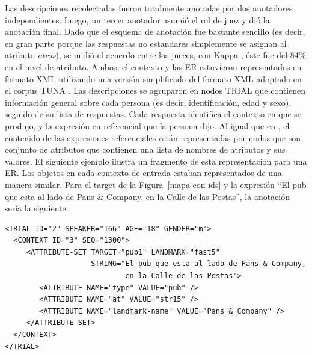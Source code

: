 
Las descripciones recolectadas fueron totalmente anotadas por dos anotadores independientes. Luego, un tercer anotador asumi\'o el rol de juez y di\'o la anotaci\'on final. Dado que el esquema de anotaci\'on fue bastante sencillo (es decir, en gran parte porque las respuestas no estandares simplemente se asignan al atributo {\em otros}), se midi\'o el acuerdo entre los jueces, con Kappa \cite{kappa}, \'este fue del 84\% en el nivel de atributo.
Ambos, el contexto y las ER estuvieron representados en formato XML utilizando una versi\'on simplificada del formato XML adoptado en el corpus TUNA \cite{tuna-corpus}. Las descripciones se agruparon en nodos TRIAL que contienen informaci\'on general sobre cada persona (es decir, identificaci\'on, edad y sexo), seguido de su lista de respuestas. Cada respuesta identifica el contexto en que se produjo, y la expresi\'on en referencial que la persona dijo.
Al igual que en \cite{tuna-corpus}, el contenido de las expresiones referenciales est\'an representadas por nodos que son conjunto de atributos que contienen una lista de nombres de atributos y sus valores. El siguiente ejemplo ilustra un fragmento de esta representaci\'on para una ER. Los objetos en cada contexto de entrada estaban representados de una manera similar.
Para el target de la Figura~\ref{mapa-con-ids} y la expresi\'on ``El pub que esta al lado de Pans \& Company, en la
Calle de las Postas'', la anotaci\'on ser\'ia la siguiente.
\begin{verbatim}
<TRIAL ID="2" SPEAKER="166" AGE="18" GENDER="m">
  <CONTEXT ID="3" SEQ="1300">
     <ATTRIBUTE-SET TARGET="pub1" LANDMARK="fast5" 
                    STRING="El pub que esta al lado de Pans & Company, 
                            en la Calle de las Postas">
        <ATTRIBUTE NAME="type" VALUE="pub" />
        <ATTRIBUTE NAME="at" VALUE="str15" />
        <ATTRIBUTE NAME="landmark-name" VALUE="Pans & Company" />
     </ATTRIBUTE-SET>
  </CONTEXT>
</TRIAL>	
\end{verbatim}



